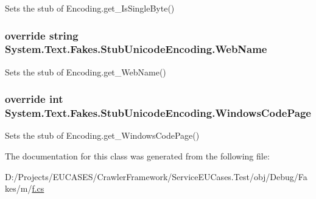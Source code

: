 Sets the stub of Encoding.\-get\-\_\-\-Is\-Single\-Byte()

\hypertarget{class_system_1_1_text_1_1_fakes_1_1_stub_unicode_encoding_a7f1a0a4901adf688cad8447116cc20c9}{
\subsubsection[{Web\-Name}]{\setlength{\rightskip}{0pt plus 5cm}override string System.\-Text.\-Fakes.\-Stub\-Unicode\-Encoding.\-Web\-Name\hspace{0.3cm}{\ttfamily [get]}}}\label{class_system_1_1_text_1_1_fakes_1_1_stub_unicode_encoding_a7f1a0a4901adf688cad8447116cc20c9}


Sets the stub of Encoding.\-get\-\_\-\-Web\-Name()

\hypertarget{class_system_1_1_text_1_1_fakes_1_1_stub_unicode_encoding_ad6301f6f3dcf83ca481cf4d4f7ec972b}{
\subsubsection[{Windows\-Code\-Page}]{\setlength{\rightskip}{0pt plus 5cm}override int System.\-Text.\-Fakes.\-Stub\-Unicode\-Encoding.\-Windows\-Code\-Page\hspace{0.3cm}{\ttfamily [get]}}}\label{class_system_1_1_text_1_1_fakes_1_1_stub_unicode_encoding_ad6301f6f3dcf83ca481cf4d4f7ec972b}


Sets the stub of Encoding.\-get\-\_\-\-Windows\-Code\-Page()



The documentation for this class was generated from the following file\-:\begin{DoxyCompactItemize}
\item 
D\-:/\-Projects/\-E\-U\-C\-A\-S\-E\-S/\-Crawler\-Framework/\-Service\-E\-U\-Cases.\-Test/obj/\-Debug/\-Fakes/m/\hyperlink{m_2f_8cs}{f.\-cs}\end{DoxyCompactItemize}
